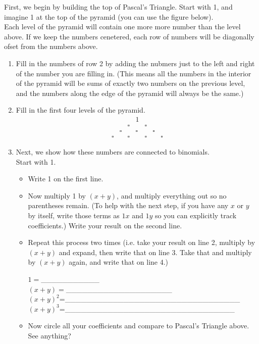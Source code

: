 \documentclass{ximera}
\begin{document}
\begin{exercise}
    First, we begin by building the top of Pascal's Triangle.  Start with 1, and imagine 1 at the top of the pyramid (you can use the figure below).\\
    Each level of the pyramid will contain one more more number than the level above.  If we keep the numbers cenetered, each row of numbers will be diagonally ofset from the numbers above.
    \begin{enumerate}
        \item Fill in the numbers of row 2 by adding the nubmers just to the left and right of the number you are filling in. (This means all the numbers in the interior of the pyramid will be sums of exactly two numbers on the previous level, and the numbers along the edge of the pyramid will always be the same.)
        \item Fill in the first four levels of the pyramid.
        \begin{align}
               & & & 1 & & & \\
               & & \square & & \square & &\\
               & \square & & \square & & \square & \\
               \square & & \square & & \square & & \square
        \end{align}
        \item Next, we show how these numbers are connected to binomials.\\
        Start with 1.\\
        \begin{itemize}
            \item Write 1 on the first line.
            \item Now multiply 1 by $(x+y)$, and multiply everything out so no parentheses remain.  (To help with the next step, if you have any $x$ or $y$ by itself, write those terms as $1x$ and $1y$ so you can explicitly track coefficients.)  Write your result on the second line.
            \item Repeat this process two times (i.e. take your result on line 2, multiply by $(x+y)$ and expand, then write that on line 3.  Take that and multiply by $(x+y)$ again, and write that on line 4.)\\
            \begin{center}
                $1=$\_\_\_\_\_\_\_\_\_\_\_\\
                $(x+y)=$\_\_\_\_\_\_\_\_\_\_\_\_\_\_\_\_\_\_\_\_\\
                $(x+y)^2$=\_\_\_\_\_\_\_\_\_\_\_\_\_\_\_\_\_\_\_\_\_\_\_\_\_\_\_\_\_\_\_\_\_\\
                $(x+y)^3$=\_\_\_\_\_\_\_\_\_\_\_\_\_\_\_\_\_\_\_\_\_\_\_\_\_\_\_\_\_\_\_\_
            \end{center}
            \item Now circle all your coefficients and compare to Pascal's Triangle above.  See anything?
        \end{itemize}
    \end{enumerate}
\end{exercise}
\end{document}
